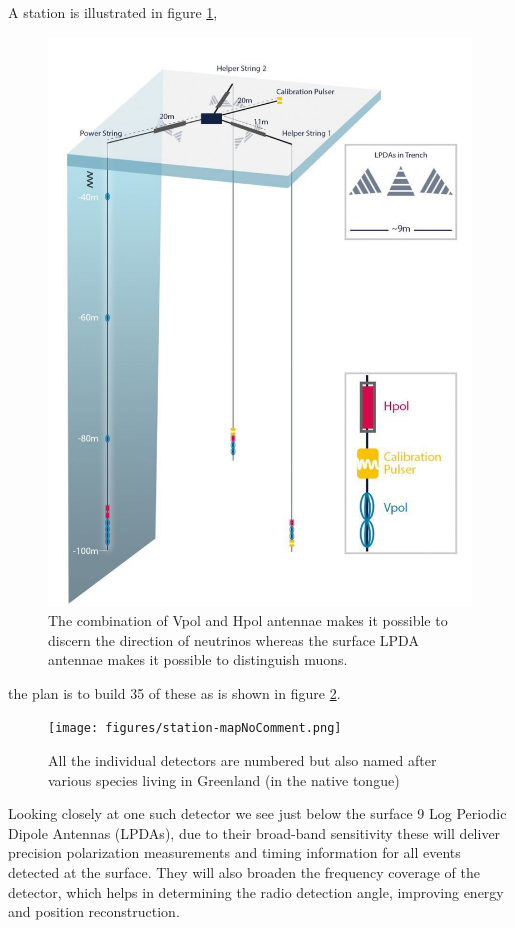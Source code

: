 A station is illustrated in figure \ref{fig:detector}, 
\begin{figure}
	\centering
	\includegraphics[height=0.4\textheight]{figures/RNO-G_station_sketch.jpg}	
	\caption{The combination of Vpol and Hpol antennae makes it possible to discern the direction of neutrinos whereas
	the surface LPDA antennae makes it possible to distinguish muons.}
	\label{fig:detector}
\end{figure}
the plan is to build 35 of these as is shown in figure \ref{fig:station map}. 
\begin{figure}
	\centering
	\texttt{[image: figures/station-mapNoComment.png]}	
	\caption{All the individual detectors are numbered but also named after various species living in
Greenland (in the native tongue)}
	\label{fig:station map}
\end{figure}
Looking closely at one such detector we see just below the surface 9 Log
Periodic Dipole Antennas (LPDAs), due to their broad-band sensitivity these
will deliver precision polarization measurements and timing information for all
events detected at the surface. They will also broaden the frequency coverage
of the detector, which helps in determining the radio detection angle,
improving energy and position reconstruction\cite{Aguilar_2021}.  

